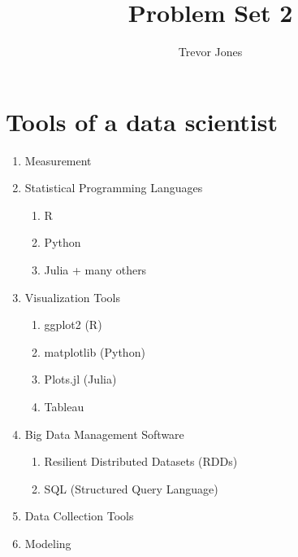 \documentclass{article}
\title{Problem Set 2}
\author{Trevor Jones}
\begin{document}
\maketitle

\section{Tools of a data scientist}
\begin{enumerate}
    \item Measurement
    \item Statistical Programming Languages
    \begin{enumerate}
        \item R
        \item Python
        \item Julia + many others
    \end{enumerate}
    \item Visualization Tools
    \begin{enumerate}
        \item ggplot2 (R)
        \item matplotlib (Python)
        \item Plots.jl (Julia)
        \item Tableau
    \end{enumerate}
    \item Big Data Management Software
    \begin{enumerate}
        \item Resilient Distributed Datasets (RDDs)
        \item SQL (Structured Query Language)
    \end{enumerate}
    \item Data Collection Tools
    \item Modeling
    
\end{enumerate}
\end{document}
